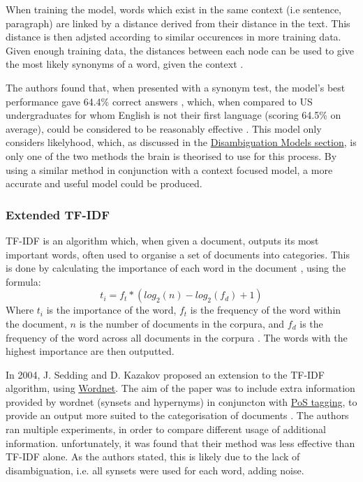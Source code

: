 \documentclass[]{article}
\begin{document}
When training the model, words which exist in the same context (i.e sentence, paragraph) are linked by a distance derived from their distance in the text. This distance is then adjsted according to similar occurences in more training data. Given enough training data, the distances between each node can be used to give the most likely synonyms of a word, given the context \cite{LatentSemanticAnalysis}.

The authors found that, when presented with a synonym test, the model's best performance gave 64.4\% correct answers , which, when compared to US undergraduates for whom English is not their first language (scoring 64.5\% on average), could be considered to be reasonably effective \cite{LatentSemanticAnalysis}. This model only considers likelyhood, which, as discussed in the \hyperref[sec:DisambiguationModels]{Disambiguation Models section}, is only one of the two methods the brain is theorised to use for this process. By using a similar method in conjunction with a context focused model, a more accurate and useful model could be produced.

\subsubsection{Extended TF-IDF}
\label{sec:TFIDF}

TF-IDF is an algorithm which, when given a document, outputs its most important words, often used to organise a set of documents into categories. This is done by calculating the importance of each word in the document \cite{TFIDF}, using the formula:
\[t_i = f_t * (log_2(n)-log_2(f_d)+1)\]
Where \(t_i\) is the importance of the word, \(f_t\) is the frequency of the word within the document, \(n\) is the number of documents in the corpura, and \(f_d\) is the frequency of the word across all documents in the corpura \cite{SeddingKazakov}. The  words with the highest importance are then outputted.

In 2004, J. Sedding and D. Kazakov proposed an extension to the TF-IDF algorithm, using \hyperref[Wordnet]{Wordnet}. The aim of the paper was to include extra information provided by wordnet (synsets and hypernyms) in conjuncton with \hyperref[sec:IntroContext]{PoS tagging}, to provide an output more suited to the categorisation of documents \cite{SeddingKazakov}. The authors ran multiple experiments, in order to compare different usage of additional information. unfortunately, it was found that their method was less effective than TF-IDF alone. As the authors stated, this is likely due to the lack of disambiguation, i.e. all synsets were used for each word, adding noise.
\end{document}
